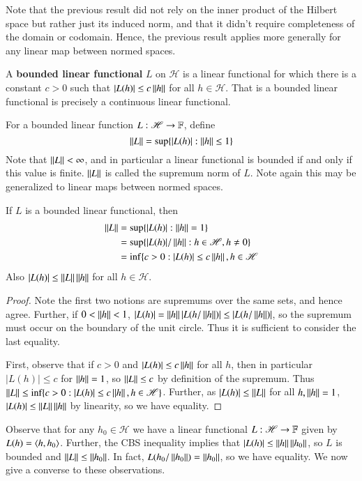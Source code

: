 Note that the previous result did not rely on the inner product of the Hilbert space but rather just its induced norm, and that it didn't require completeness of the domain or codomain. Hence, the previous result applies more generally for any linear map between normed spaces.

\begin{defn}
    A \textbf{bounded linear functional} $L$ on $\mathscr{H}$ is a linear functional for which there is a constant $c > 0$ such that $|L(h)| \leq c\left|\left| h\right|\right|$ for all $h \in \mathscr{H}$. That is a bounded linear functional is precisely a continuous linear functional.
\end{defn}
For a bounded linear function $L:\mathscr{H}\rightarrow \mathbb F$, define $$\left|\left| L\right|\right| = \text{sup}\{|L(h)|:\left|\left| h\right|\right| \leq 1\}$$
Note that $\left|\left| L\right|\right| < \infty$, and in particular a linear functional is bounded if and only if this value is finite. $\left|\left| L\right|\right|$ is called the supremum norm of $L$. Note again this may be generalized to linear maps between normed spaces.

\begin{prop}
    If $L$ is a bounded linear functional, then \begin{align*}
        \left|\left| L\right|\right| &= \text{sup}\{|L(h)|:\left|\left| h\right|\right| = 1\} \\
        &= \text{sup}\{|L(h)|/\left|\left| h\right|\right|: h \in\mathscr{H},h\neq 0\} \\
        &= \inf\{c > 0:|L(h)|\leq c\left|\left| h\right|\right|, h \in \mathscr{H}
    \end{align*}
    Also $|L(h)| \leq \left|\left| L\right|\right|\left|\left| h\right|\right|$ for all $h \in \mathscr{H}$.
\end{prop}
\begin{proof}
    Note the first two notions are supremums over the same sets, and hence agree. Further, if $0 < \left|\left| h\right|\right| < 1$, $|L(h)| = \left|\left| h\right|\right||L(h/\left|\left| h\right|\right|)| \leq |L(h/\left|\left| h\right|\right|)|$, so the supremum must occur on the boundary of the unit circle. Thus it is sufficient to consider the last equality.

    First, observe that if $c > 0$ and $|L(h)| \leq c\left|\left| h\right|\right|$ for all $h$, then in particular $|L(h)| \leq c$ for $\left|\left| h\right|\right| = 1$, so $\left|\left| L\right|\right| \leq c$ by definition of the supremum. Thus $\left|\left| L\right|\right| \leq \text{inf}\{c > 0:|L(h)|\leq c\left|\left| h\right|\right|, h \in \mathscr{H}\}$. Further, as $|L(h)| \leq \left|\left| L\right|\right|$ for all $h,\left|\left| h\right|\right| = 1$, $|L(h)| \leq \left|\left| L\right|\right|\left|\left| h\right|\right|$ by linearity, so we have equality.
\end{proof}

Observe that for any $h_0 \in \mathscr{H}$ we have a linear functional $L:\mathscr{H}\rightarrow \mathbb F$ given by $L(h) = \left\langle h, h_0\right\rangle$. Further, the CBS inequality implies that $|L(h)| \leq \left|\left| h\right|\right|\left|\left| h_0\right|\right|$, so $L$ is bounded and $\left|\left| L\right|\right| \leq \left|\left| h_0\right|\right|$. In fact, $L(h_0/\left|\left| h_0\right|\right|) = \left|\left| h_0\right|\right|$, so we have equality. We now give a converse to these observations.


